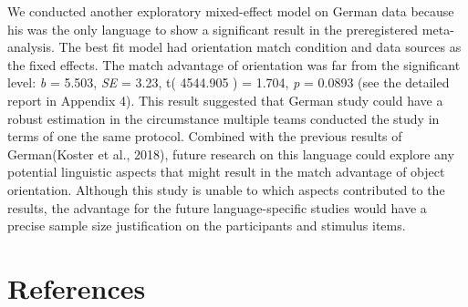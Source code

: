 \documentclass[
  man,floatsintext]{apa6}
\begin{document}
We conducted another exploratory mixed-effect model on German data because his was the only language to show a significant result in the preregistered meta-analysis. The best fit model had orientation match condition and data sources as the fixed effects. The match advantage of orientation was far from the significant level: \emph{b} = 5.503, \emph{SE} = 3.23, t( 4544.905 ) = 1.704, \emph{p} = 0.0893 (see the detailed report in Appendix 4). This result suggested that German study could have a robust estimation in the circumstance multiple teams conducted the study in terms of one the same protocol. Combined with the previous results of German(Koster et al., 2018), future research on this language could explore any potential linguistic aspects that might result in the match advantage of object orientation. Although this study is unable to which aspects contributed to the results, the advantage for the future language-specific studies would have a precise sample size justification on the participants and stimulus items.

\newpage

\hypertarget{references}{%
\section{References}\label{references}}

\begingroup
\setlength{\parindent}{-0.5in}
\setlength{\leftskip}{0.5in}
\end{document}
